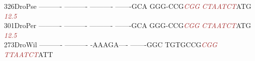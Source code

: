 \documentclass[11pt,twoside,reqno,a4paper]{article}
\begin{document}
{326\hspace*{1\charwidth}DroPse	----------	----------	----------	-------GCA	GGG-CCG\textit{\textcolor{brown}{C}}\textit{\textcolor{brown}{G}}\textit{\textcolor{brown}{G}}	\textit{\textcolor{brown}{C}}\textit{\textcolor{brown}{T}}\textit{\textcolor{brown}{A}}\textit{\textcolor{brown}{A}}\textit{\textcolor{brown}{T}}\textit{\textcolor{brown}{C}}\textit{\textcolor{brown}{T}}ATG	\\
\hspace*{4\charwidth}\hspace*{7\charwidth}\hspace*{1\charwidth}\hspace*{1\charwidth}\hspace*{1\charwidth}\hspace*{1\charwidth}\hspace*{47\charwidth}\textit{\textcolor{brown}{12.5}}\hspace*{1\charwidth}\hspace*{1\charwidth}\\
301\hspace*{1\charwidth}DroPer	----------	----------	----------	-------GCA	GGG-CCG\textit{\textcolor{brown}{C}}\textit{\textcolor{brown}{G}}\textit{\textcolor{brown}{G}}	\textit{\textcolor{brown}{C}}\textit{\textcolor{brown}{T}}\textit{\textcolor{brown}{A}}\textit{\textcolor{brown}{A}}\textit{\textcolor{brown}{T}}\textit{\textcolor{brown}{C}}\textit{\textcolor{brown}{T}}ATG	\\
\hspace*{4\charwidth}\hspace*{7\charwidth}\hspace*{1\charwidth}\hspace*{1\charwidth}\hspace*{1\charwidth}\hspace*{1\charwidth}\hspace*{47\charwidth}\textit{\textcolor{brown}{12.5}}\hspace*{1\charwidth}\hspace*{1\charwidth}\\
273\hspace*{1\charwidth}DroWil	----------	----------	-AAAGA----	-------GGC	TGTGCCG\textit{\textcolor{brown}{C}}\textit{\textcolor{brown}{G}}\textit{\textcolor{brown}{G}}	\textit{\textcolor{brown}{T}}\textit{\textcolor{brown}{T}}\textit{\textcolor{brown}{A}}\textit{\textcolor{brown}{A}}\textit{\textcolor{brown}{T}}\textit{\textcolor{brown}{C}}\textit{\textcolor{brown}{T}}ATT	\\
}
\end{document}
